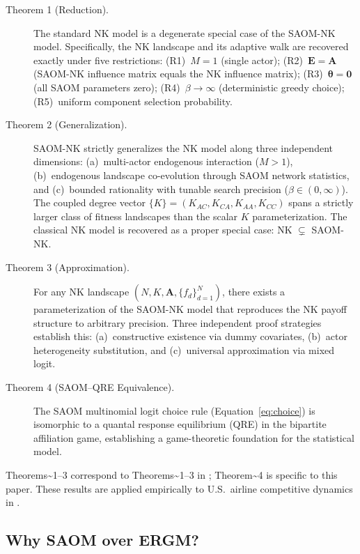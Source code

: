 \documentclass[
]{article}
\begin{document}
\begin{description}

\item[Theorem 1 (Reduction).] The standard NK model is a degenerate special case
of the SAOM-NK model.  Specifically, the NK landscape and its adaptive walk are
recovered exactly under five restrictions: (R1)~$M = 1$ (single actor);
(R2)~$\mathbf{E} = \mathbf{A}$ (SAOM-NK influence matrix equals the NK
influence matrix); (R3)~$\boldsymbol{\theta} = \mathbf{0}$ (all SAOM
parameters zero); (R4)~$\beta \to \infty$ (deterministic greedy choice);
(R5)~uniform component selection probability.

\item[Theorem 2 (Generalization).] SAOM-NK strictly generalizes the NK model
along three independent dimensions: (a)~multi-actor endogenous interaction
($M > 1$), (b)~endogenous landscape co-evolution through SAOM network
statistics, and (c)~bounded rationality with tunable search precision
($\beta \in (0, \infty)$).  The coupled degree vector
$\{K\}= (K_{AC}, K_{CA}, K_{AA}, K_{CC})$ spans a strictly larger class of
fitness landscapes than the scalar $K$ parameterization.  The classical NK
model is recovered as a proper special case: NK $\subsetneq$ SAOM-NK.

\item[Theorem 3 (Approximation).] For any NK landscape
$(N, K, \mathbf{A}, \{f_d\}_{d=1}^N)$, there exists a parameterization
of the SAOM-NK model that reproduces the NK payoff structure to arbitrary
precision.  Three independent proof strategies establish this: (a)~constructive
existence via dummy covariates, (b)~actor heterogeneity substitution, and
(c)~universal approximation via mixed logit.

\item[Theorem 4 (SAOM--QRE Equivalence).] The SAOM multinomial logit choice
rule (Equation~\ref{eq:choice}) is isomorphic to a quantal response
equilibrium (QRE) in the bipartite affiliation game, establishing a
game-theoretic foundation for the statistical model.

\end{description}

\noindent Theorems\textasciitilde1--3 correspond to
Theorems\textasciitilde1--3 in \citet{downing2026architecture};
Theorem\textasciitilde4 is specific to this paper. These results are
applied empirically to U.S.~airline competitive dynamics in
\citet{downing2026architecture}.

\subsection{Why SAOM over ERGM?}\label{sec:saom-ergm}
\end{document}
